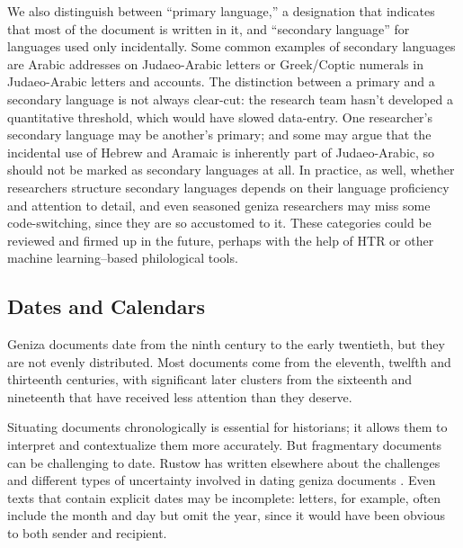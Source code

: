 \documentclass{article}
\begin{document}
We also distinguish between “primary language,” a designation that indicates that most of the document is written in it, and “secondary language” for languages used only incidentally. Some common examples of secondary languages are Arabic addresses on Judaeo-Arabic letters or Greek/Coptic numerals in Judaeo-Arabic letters and accounts. The distinction between a primary and a secondary language is not always clear-cut: the research team hasn't developed a quantitative threshold, which would have slowed data-entry. One researcher's secondary language may be another's primary; and some may argue that the incidental use of Hebrew and Aramaic is inherently part of Judaeo-Arabic, so should not be marked as secondary languages at all. In practice, as well, whether researchers structure secondary languages depends on their language proficiency and attention to detail, and even seasoned geniza researchers may miss some code-switching, since they are so accustomed to it. These categories could be reviewed and firmed up in the future, perhaps with the help of HTR or other machine learning–based philological tools.

\subsection{Dates and Calendars}

Geniza documents date from the ninth century to the early twentieth, but they are not evenly distributed. Most documents come from the eleventh, twelfth and thirteenth centuries, with significant later clusters from the sixteenth and nineteenth that have received less attention than they deserve.

Situating documents chronologically is essential for historians; it allows them to interpret and contextualize them more accurately. But fragmentary documents can be challenging to date. Rustow has written elsewhere about the challenges and different types of uncertainty involved in dating geniza documents \autocite{rustow_dating_nodate}. Even texts that contain explicit dates may be incomplete: letters, for example, often include the month and day but omit the year, since it would have been obvious to both sender and recipient. 
\end{document}
